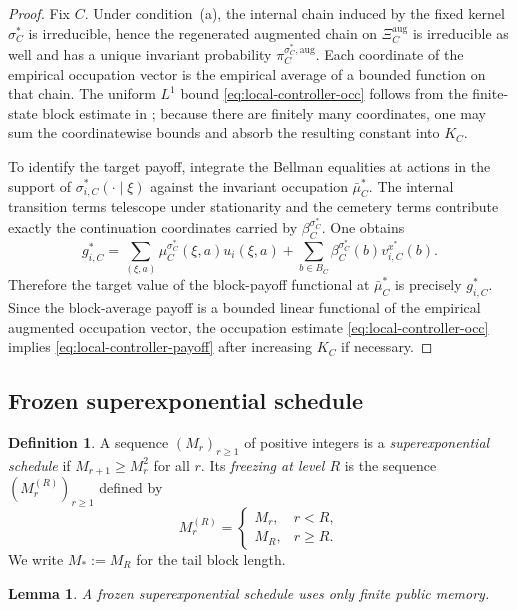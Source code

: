 \documentclass[12pt]{article}
\newtheorem{lemma}[theorem]{Lemma}
\theoremstyle{definition}
\newtheorem{definition}[theorem]{Definition}
\newcommand{\1}{\mathbf{1}}
\begin{document}
\begin{proof}
Fix $C$.  Under condition~\textnormal{(a)}, the internal chain induced by the fixed
kernel $\sigma_C^*$ is irreducible, hence the regenerated augmented chain on
$\Xi_C^{\mathrm{aug}}$ is irreducible as well and has a unique invariant
probability $\pi_C^{\sigma_C^*,\mathrm{aug}}$.  Each coordinate of the empirical
occupation vector is the empirical average of a bounded function on that chain.
The uniform $L^1$ bound \eqref{eq:local-controller-occ} follows from the
finite-state block estimate in ; because there are
finitely many coordinates, one may sum the coordinatewise bounds and absorb the
resulting constant into $K_C$.

To identify the target payoff, integrate the Bellman equalities at actions in the
support of $\sigma_{i,C}^*(\cdot\mid\xi)$ against the invariant occupation
$\bar\mu_C^*$.  The internal transition terms telescope under stationarity and the
cemetery terms contribute exactly the continuation coordinates carried by
$\beta_C^{\sigma_C^*}$.  One obtains
\[
g_{i,C}^*
=
\sum_{(\xi,a)}\mu_C^{\sigma_C^*}(\xi,a)u_i(\xi,a)
+
\sum_{b\in B_C}\beta_C^{\sigma_C^*}(b)v_{i,C}^{x^*}(b).
\]
Therefore the target value of the block-payoff functional at $\bar\mu_C^*$ is
precisely $g_{i,C}^*$.  Since the block-average payoff is a bounded linear
functional of the empirical augmented occupation vector, the occupation estimate
\eqref{eq:local-controller-occ} implies \eqref{eq:local-controller-payoff} after
increasing $K_C$ if necessary.
\end{proof}

\subsection{Frozen superexponential schedule}

\begin{definition}
A sequence $(M_r)_{r\ge 1}$ of positive integers is a
\emph{superexponential schedule} if $M_{r+1}\ge M_r^2$ for all $r$.  Its
\emph{freezing at level $R$} is the sequence $(M_r^{(R)})_{r\ge 1}$ defined by
\[
M_r^{(R)}=
\begin{cases}
M_r, & r<R,\\
M_R, & r\ge R.
\end{cases}
\]
We write $M_*:=M_R$ for the tail block length.
\end{definition}

\begin{lemma}
\label{lem:frozen-memory}
A frozen superexponential schedule uses only finite public memory.
\end{lemma}
\end{document}
